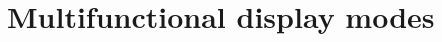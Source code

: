 \documentclass[Orbiter User Manual.tex]{subfiles}
\begin{document}
\section{Multifunctional display modes}

\end{document}
